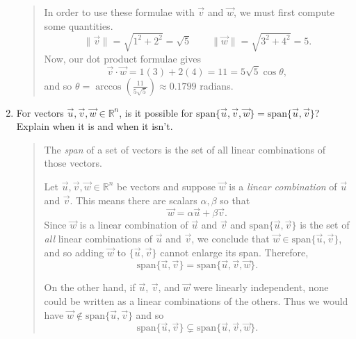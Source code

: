 \documentclass[letter]{article}
\newcommand{\R}{\mathbb{R}}
\newcommand{\Span}{\mathrm{span}}
\begin{document}
\begin{enumerate}
\begin{quote}
			In order to use these formulae with $\vec v$ and $\vec w$, we
			must first compute some quantities. 
			\[
				\|\vec v\| = \sqrt{1^2+2^2}=\sqrt{5}\qquad
				\|\vec w\| = \sqrt{3^2+4^2}=5.
			\]
			Now, our dot product formulae gives
			\[
				\vec v\cdot\vec w = 1(3)+2(4) = 11=5\sqrt{5}\cos\theta,
			\]
			and so $\theta=\arccos\left(\frac{11}{5\sqrt{5}}\right)\approx 0.1799$ radians.
		\end{quote}

		\item For vectors $\vec u,\vec v,\vec w\in\R^n$, is it possible for
		$\Span\{\vec u,\vec v,\vec w\}=\Span\{\vec u,\vec v\}$?  Explain when it is
		and when it isn't.
		\begin{quote}
			The \emph{span} of a set of vectors is the set of all
			linear combinations of those vectors.

			Let $\vec u,\vec v,\vec w\in\R^n$ be vectors and suppose
			$\vec w$ is a \emph{linear combination} of $\vec u$ and $\vec v$.
			This means there are scalars $\alpha,\beta$ so that
			\[
				\vec w=\alpha\vec u+\beta\vec v.
			\]
			Since $\vec w$ is a linear combination of $\vec u$ and $\vec v$
			and $\Span\{\vec u,\vec v\}$ is the set of \emph{all}
			linear combinations of $\vec u$ and $\vec v$, we conclude that
			$\vec w\in\Span\{\vec u,\vec v\}$, and so adding $\vec w$
			to $\{\vec u,\vec v\}$ cannot enlarge its span.  Therefore,
			\[
				\Span\{\vec u,\vec v\}=\Span\{\vec u,\vec v,\vec w\}.
			\]

			On the other hand, if $\vec u$, $\vec v$, and $\vec w$ were
			linearly independent, none could be written as a linear combinations
			of the others.  Thus we would have $\vec w\notin\Span\{\vec u,\vec v\}$
			and so
			\[
				\Span\{\vec u,\vec v\}\subsetneq\Span\{\vec u,\vec v,\vec w\}.
			\]
		\end{quote}
	\end{enumerate}
\end{document}

